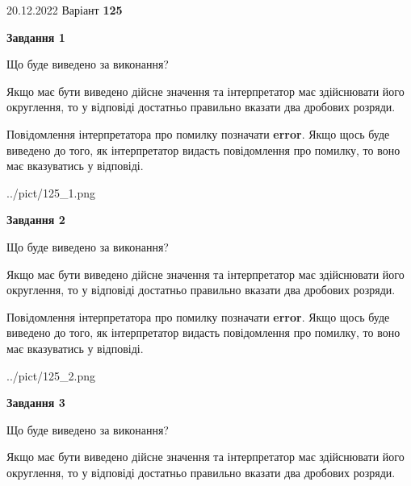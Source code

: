 \documentclass[12pt, ukrainian]{article}
\begin{document}
{20.12.2022 Варіант \No \textbf { 125 }\par}
{
\begin {Large}

{\begin {center}\textbf{Завдання 1}\end {center}}\par
Що буде виведено за виконання? \par

Якщо має бути виведено дійсне значення та інтерпретатор має здійснювати його округлення, 
то у відповіді достатньо правильно вказати два дробових розряди.

Повідомлення інтерпретатора про помилку позначати \textbf{error}.
Якщо щось буде виведено до того, як інтерпретатор видасть повідомлення про помилку, 
то воно має вказуватись у відповіді. \par

\begin{center}
	{../pict/125_1.png}
\end{center}
\newpage

{\begin {center}\textbf{Завдання 2}\end {center}}\par
Що буде виведено за виконання? \par

Якщо має бути виведено дійсне значення та інтерпретатор має здійснювати його округлення, 
то у відповіді достатньо правильно вказати два дробових розряди.

Повідомлення інтерпретатора про помилку позначати \textbf{error}.
Якщо щось буде виведено до того, як інтерпретатор видасть повідомлення про помилку, 
то воно має вказуватись у відповіді. \par

\begin{center}
	{../pict/125_2.png}
\end{center}
\newpage

{\begin {center}\textbf{Завдання 3}\end {center}}\par
Що буде виведено за виконання? \par

Якщо має бути виведено дійсне значення та інтерпретатор має здійснювати його округлення, 
то у відповіді достатньо правильно вказати два дробових розряди.


\end{Large}}
\end{document}
